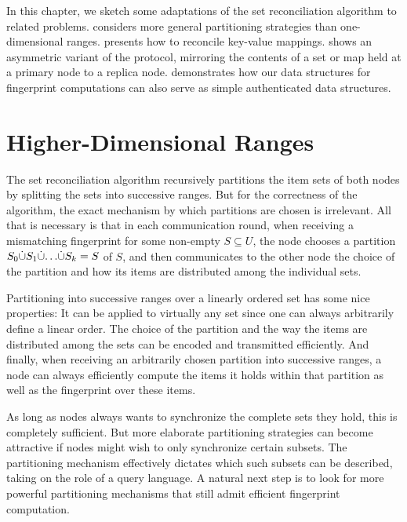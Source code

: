 
In this chapter, we sketch some adaptations of the set reconciliation algorithm to related problems.  considers more general partitioning strategies than one-dimensional ranges.  presents how to reconcile key-value mappings.  shows an asymmetric variant of the protocol, mirroring the contents of a set or map held at a primary node to a replica node.  demonstrates how our data structures for fingerprint computations can also serve as simple authenticated data structures.

\section{Higher-Dimensional Ranges}
\label{general-partitions}

The set reconciliation algorithm recursively partitions the item sets of both nodes by splitting the sets into successive ranges. But for the correctness of the algorithm, the exact mechanism by which partitions are chosen is irrelevant. All that is necessary is that in each communication round, when receiving a mismatching fingerprint for some non-empty $S \subseteq U$, the node chooses a partition ${S_0} \dot{\cup} {{S_1} \dot{\cup} {{\ldots} \dot{\cup} {S_k}}} = S$ of $S$, and then communicates to the other node the choice of the partition and how its items are distributed among the individual sets.

Partitioning into successive ranges over a linearly ordered set has some nice properties: It can be applied to virtually any set since one can always arbitrarily define a linear order. The choice of the partition and the way the items are distributed among the sets can be encoded and transmitted efficiently. And finally, when receiving an arbitrarily chosen partition into successive ranges, a node can always efficiently compute the items it holds within that partition as well as the fingerprint over these items.

As long as nodes always wants to synchronize the complete sets they hold, this is completely sufficient. But more elaborate partitioning strategies can become attractive if nodes might wish to only synchronize certain subsets. The partitioning mechanism effectively dictates which such subsets can be described, taking on the role of a query language. A natural next step is to look for more powerful partitioning mechanisms that still admit efficient fingerprint computation.

